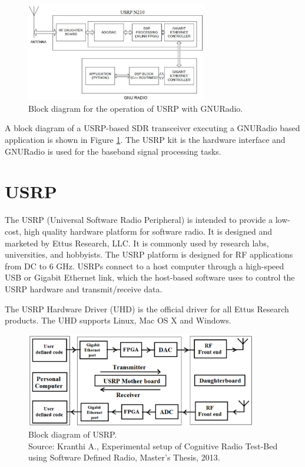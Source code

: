 \begin{figure}
  \centering
  \includegraphics[width=0.7\textwidth]{usrpGNURadioBlock}
  \caption[USRP operation with GNURadio]{Block diagram for the operation of USRP
  with GNURadio.}
  \label{usrpGNURadioBlock}
\end{figure}

A block diagram of a USRP-based SDR transceiver executing a GNURadio based 
application is shown in Figure \ref{usrpGNURadioBlock}. The USRP kit is the 
hardware interface and GNURadio is used for the baseband signal processing
tasks.


\section{USRP}

The USRP (Universal Software Radio Peripheral) is intended to provide a 
low-cost, high quality hardware platform for software radio. It is designed
and marketed by Ettus Research, LLC. It is commonly used by research labs,
universities, and hobbyists. The USRP platform is designed for RF applications
from DC to 6 GHz. USRPs connect to a host computer through a high-speed USB or
Gigabit Ethernet link, which the host-based software uses to control the USRP
hardware and transmit/receive data.

The USRP Hardware Driver (UHD) is the official driver for all Ettus Research
products. The UHD supports Linux, Mac OS X and Windows.

\begin{figure}
\centering
\includegraphics[width=0.9\textwidth]{usrpBlock}
\caption[Block diagram of USRP]{Block diagram of USRP.\\
\footnotesize{Source: Kranthi A., Experimental setup of Cognitive Radio 
Test-Bed using Software Defined Radio, Master's Thesis, 2013.}}
\label{usrpBlock}
\end{figure}

